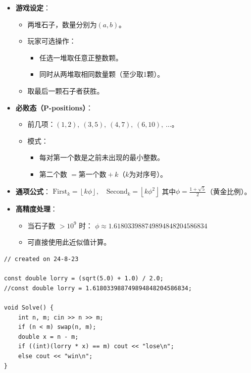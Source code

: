 \documentclass[a4paper,12pt]{article}
\begin{document}
\begin{itemize}
    \item \textbf{游戏设定}：
    \begin{itemize}
        \item 两堆石子，数量分别为$(a, b)$。
        \item 玩家可选操作：
        \begin{itemize}
            \item 任选一堆取任意正整数颗。
            \item 同时从两堆取相同数量颗（至少取1颗）。
        \end{itemize}
        \item 取最后一颗石子者获胜。
    \end{itemize}
    
    \item \textbf{必败态（P-positions）}：
    \begin{itemize}
        \item 前几项：$(1,2),\ (3,5),\ (4,7),\ (6,10),\ \ldots$。
        \item 模式：
        \begin{itemize}
            \item 每对第一个数是之前未出现的最小整数。
            \item 第二个数 $= \text{第一个数} + k$（$k$为对序号）。
        \end{itemize}
    \end{itemize}
    
    \item \textbf{通项公式}：
    \(
    \text{First}_k = \left\lfloor k\phi \right\rfloor, \quad 
    \text{Second}_k = \left\lfloor k\phi^2 \right\rfloor
    \)
    其中$\phi = \frac{1+\sqrt{5}}{2}$（黄金比例）。
    
    \item \textbf{高精度处理}：
    \begin{itemize}
        \item 当石子数 $> 10^9$ 时：
        \(
        \phi \approx 1.618033988749894848204586834
        \)
        \item 可直接使用此近似值计算。
    \end{itemize}
\end{itemize}

\begin{lstlisting}
// created on 24-8-23

const double lorry = (sqrt(5.0) + 1.0) / 2.0;
//const double lorry = 1.618033988749894848204586834;

void Solve() {
    int n, m; cin >> n >> m;
    if (n < m) swap(n, m);
    double x = n - m;
    if ((int)(lorry * x) == m) cout << "lose\n";
    else cout << "win\n";
}
\end{lstlisting}
\end{document}
